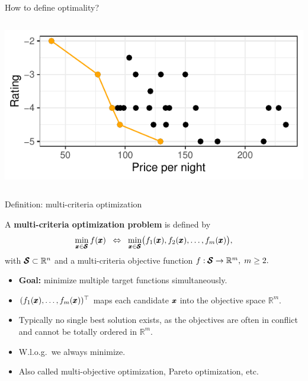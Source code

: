 \documentclass[11pt,compress,t,notes=noshow,xcolor=table]{beamer}
\begin{document}
\begin{vbframe}{How to define optimality?}
\begin{columns}[c]
        \includegraphics[width=\textwidth]{slides/11-multicrit/figure_man/expedia-5-1.pdf}
    \end{columns}

\end{vbframe}


\begin{vbframe}{Definition: multi-criteria optimization}

A \textbf{multi-criteria optimization problem} is defined by
\[
\min_{\pmb{x} \in \pmb{\mathcal{S}}}  f(\pmb{x}) 
\;\;\Leftrightarrow\;\;
\min_{\pmb{x} \in \pmb{\mathcal{S}}} 
\bigl(f_1(\pmb{x}), f_2(\pmb{x}), \dots, f_m(\pmb{x})\bigr),
\]
with \(\pmb{\mathcal{S}} \subset \mathbb{R}^n\) and a multi-criteria objective function
\(f: \pmb{\mathcal{S}} \to \mathbb{R}^m,\; m \ge 2.\)

\begin{itemize}
\item \textbf{Goal:} minimize multiple target functions simultaneously.
\item \((f_1(\pmb{x}), \dots, f_m(\pmb{x}))^\top\) maps each candidate 
      \(\pmb{x}\) into the objective space \(\mathbb{R}^m\).
\item Typically no single best solution exists, as the objectives are often 
      in conflict and cannot be totally ordered in \(\mathbb{R}^m\).
\item W.l.o.g.\ we always minimize.
\item Also called multi-objective optimization, Pareto optimization, etc.
\end{itemize}

\end{vbframe}
\end{document}

